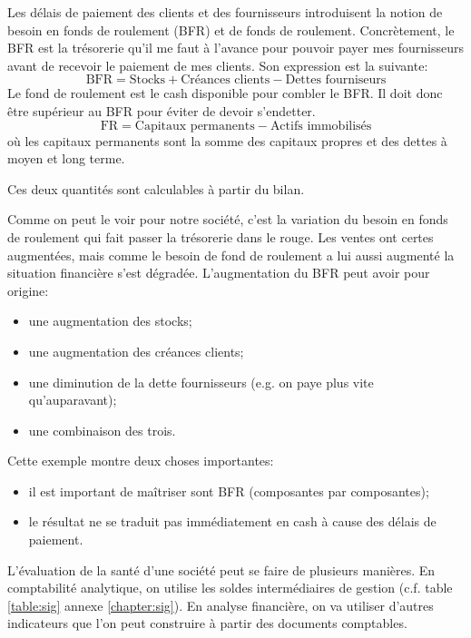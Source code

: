 Les délais de paiement des clients et des fournisseurs 
introduisent la notion de besoin en fonds de roulement (BFR) 
et de fonds de roulement. Concrètement, le BFR est la 
trésorerie qu'il me faut à l'avance pour pouvoir payer mes 
fournisseurs avant de recevoir le paiement de mes clients.
Son expression est la suivante:
\begin{equation*} \label{eq:BFR}
\mathrm{BFR} = \text{Stocks} + \text{Créances clients} - \text{Dettes fourniseurs}
\end{equation*}
Le fond de roulement est le cash disponible pour combler le 
BFR. Il doit donc être supérieur au BFR pour éviter de devoir 
s'endetter.
\[
\mathrm{FR} = \text{Capitaux permanents} - \text{Actifs immobilisés}
\]
où les capitaux permanents sont la somme des capitaux propres et des dettes à moyen et long terme.

Ces deux quantités sont calculables à partir du bilan.

Comme on peut le voir pour notre société, c'est la variation 
du besoin en fonds de roulement qui fait passer la trésorerie 
dans le rouge. Les ventes ont certes augmentées, mais comme 
le besoin de fond de roulement a lui aussi augmenté la 
situation financière s'est dégradée. 
L'augmentation du BFR peut avoir pour origine: 
\begin{itemize}
 \item une augmentation des stocks;
 \item une augmentation des créances clients;
 \item une diminution de la dette fournisseurs (e.g. on paye plus vite qu'auparavant);
 \item une combinaison des trois.
\end{itemize}

Cette exemple montre deux choses importantes:
\begin{itemize}
 \item il est important de maîtriser sont BFR (composantes par composantes);
 \item le résultat ne se traduit pas immédiatement en cash à cause des délais de paiement.
\end{itemize}

L'évaluation de la santé d'une société peut se faire de 
plusieurs manières. En comptabilité analytique, on utilise 
les soldes intermédiaires de gestion (c.f.\/ table \ref{table:sig} annexe \ref{chapter:sig}). 
En analyse financière, on va utiliser d'autres indicateurs que l'on peut 
construire à partir des documents comptables. 

